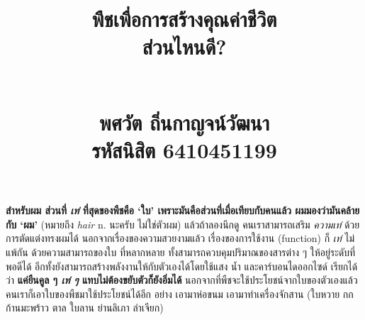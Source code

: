 \documentclass{article}
\title{\flushleft\Large พืชเพื่อการสร้างคุณค่าชีวิต\\
\Huge\textbf{ส่วนไหนดี?}\\
\rule{0em}{1ex}\\
\normalsize พศวัต ถิ่นกาญจน์วัฒนา\\
รหัสนิสิต 6410451199
\vspace{-8ex}}
\author{}
\date{}
\begin{document}
\maketitle
\sloppy\flushleft
\textbf{สำหรับผม ส่วนที่ \textit{เท่} ที่สุดของพืชคือ `ใบ' เพราะมันคือส่วนที่เมื่อเทียบกับคนแล้ว ผมมองว่ามันคล้ายกับ `ผม'} (\mbox{หมายถึง} \textit{hair} n. นะครับ ไม่ใช่ตัวผม)
แล้วถ้าลองนึกดู คนเราสามารถเสริม \textit{ความเท่} ด้วยการตัดแต่งทรงผมได้ นอกจากเรื่องของความสวยงามแล้ว เรื่องของการใช้งาน (function) ก็ \textit{เท่} ไม่แพ้กัน ด้วยความสามารถของใบ
ที่หลากหลาย ทั้งสามารถควบคุมปริมาณของสารต่าง ๆ ให้อยู่ระดับที่พอดีได้ อีกทั้งยังสามารถสร้างพลังงานให้กับตัวเองได้โดยใช้แสง น้ำ และคาร์บอนไดออกไซด์
เรียกได้ว่า \textbf{แค่ยืนคูล ๆ \textit{เท่ ๆ} แทบไม่ต้องขยับตัวก็ยังอิ่มได้} นอกจากที่พืชจะใช้ประโยชน์จากใบของตัวเองแล้ว
คนเราก็เอาใบของพืชมาใช้ประโยชน์ได้อีก อย่าง เอามาห่อขนม เอามาทำเครื่องจักสาน (ใบหวาย กก ก้านมะพร้าว ตาล ใบลาน ย่านลิเภา ลำเจียก)
\end{document}
